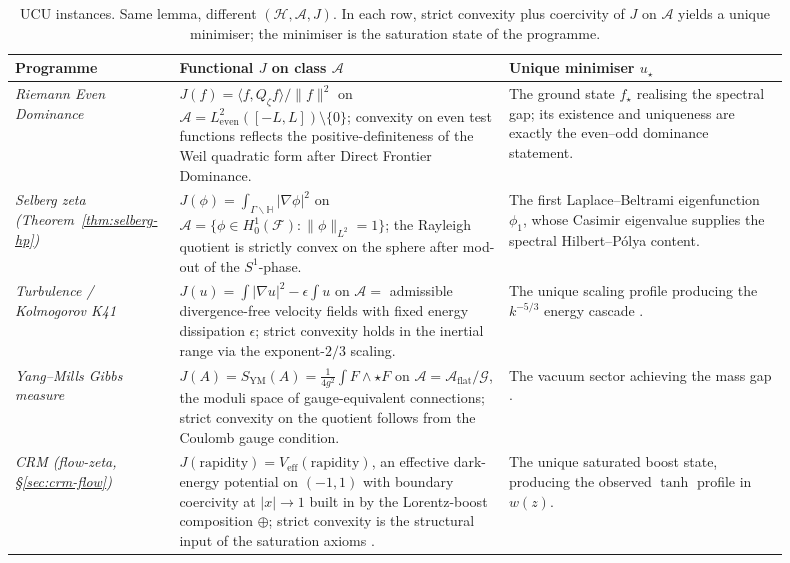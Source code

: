 \documentclass[11pt]{article}
\theoremstyle{definition}
\theoremstyle{remark}
\begin{document}
\renewcommand{\arraystretch}{1.25}
\begin{table}[htbp]
\centering
\scriptsize
\setlength{\tabcolsep}{3pt}
\begin{tabular}{|p{0.16\linewidth}|p{0.40\linewidth}|p{0.34\linewidth}|}
\hline
\textbf{Programme} & \textbf{Functional $J$ on class $\mathcal{A}$} &
\textbf{Unique minimiser $u_\star$} \\ \hline

\emph{Riemann Even Dominance} \cite{Geiger2026RHII}
& $J(f) = \langle f, Q_\zeta f \rangle / \|f\|^2$ on
$\mathcal{A} = L^2_\mathrm{even}([-L,L]) \setminus \{0\}$;
convexity on even test functions reflects the positive-definiteness
of the Weil quadratic form after Direct Frontier Dominance.
& The ground state $f_\star$ realising the spectral gap;
its existence and uniqueness are exactly the
even--odd dominance statement. \\ \hline

\emph{Selberg zeta (Theorem~\ref{thm:selberg-hp})}
& $J(\phi) = \int_{\Gamma\backslash\mathbb{H}} |\nabla \phi|^2$
on $\mathcal{A} = \{\phi \in H^1_0(\mathcal{F}) : \|\phi\|_{L^2}=1\}$;
the Rayleigh quotient is strictly convex on the sphere after
mod-out of the $S^1$-phase.
& The first Laplace--Beltrami eigenfunction $\phi_1$, whose
Casimir eigenvalue supplies the spectral Hilbert--P\'olya content. \\ \hline

\emph{Turbulence / Kolmogorov K41}
& $J(u) = \int |\nabla u|^2 - \epsilon \int u$ on
$\mathcal{A} = $ admissible divergence-free velocity fields with
fixed energy dissipation $\epsilon$; strict convexity holds in the
inertial range via the exponent-$2/3$ scaling.
& The unique scaling profile producing the $k^{-5/3}$ energy
cascade \cite{FSTTurbulence}. \\ \hline

\emph{Yang--Mills Gibbs measure}
& $J(A) = S_{\mathrm{YM}}(A) = \tfrac{1}{4g^2}\int F \wedge {\star F}$
on $\mathcal{A} = \mathcal{A}_{\mathrm{flat}} / \mathcal{G}$, the
moduli space of gauge-equivalent connections; strict convexity on
the quotient follows from the Coulomb gauge condition.
& The vacuum sector achieving the mass gap
\cite{FSTYangMills}. \\ \hline

\emph{CRM (flow-zeta, \S\ref{sec:crm-flow})}
& $J(\mathrm{rapidity}) = V_{\mathrm{eff}}(\mathrm{rapidity})$, an
effective dark-energy potential on $(-1,1)$ with boundary
coercivity at $|x| \to 1$ built in by the Lorentz-boost composition
$\oplus$; strict convexity is the structural input of the
saturation axioms \cite{CRMV}.
& The unique saturated boost state, producing the observed $\tanh$
profile in $w(z)$. \\ \hline

\end{tabular}
\caption{UCU instances. Same lemma, different
$(\mathcal{H},\mathcal{A},J)$. In each row, strict convexity
plus coercivity of $J$ on $\mathcal{A}$ yields a unique
minimiser; the minimiser is the saturation state of the
programme.}
\label{tab:ucu-instances}
\end{table}
\renewcommand{\arraystretch}{1.0}
\end{document}
